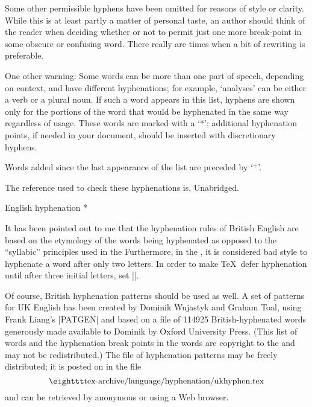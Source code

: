 Some other permissible hyphens have been omitted
for reasons of style or clarity.  While this is at
least partly a matter of personal taste, an author should think of the
reader when deciding whether or not to permit just one more break-point
in some obscure or confusing word.  There really are times when a bit of
rewriting is preferable.

One other warning: Some words can be more than one part of speech,
depending on context, and have different hyphenations; for example,
`analyses' can be either a verb or a plural noun.  If such a word appears
in this list, hyphens are shown only for the portions of the word that
would be hyphenated in the same way regardless of usage.  These words
are marked with a `*'; additional hyphenation points, if needed in your
document, should be inserted with discretionary hyphens.

Words added since the last appearance of the list are preceded by `${}^+$'.

The reference used to check these hyphenations is, Unabridged.

\head * English hyphenation *

It has been pointed out to me that the hyphenation rules of British English
are based on the etymology of the words being hyphenated as opposed to
the ``syllabic'' principles used in the   Furthermore, in the
, it is considered bad style to hyphenate a word after only two letters.
In order to make \TeX\ defer hyphenation until after three initial letters,
set ||.

Of course, British hyphenation patterns should be used as well.
A set of patterns for UK English has been created by Dominik Wujastyk and
Graham Toal, using Frank Liang's |PATGEN| and based on a file of 114925
British-hyphenated words generously made available to Dominik by Oxford
University Press.  (This list of words and the hyphenation break points
in the words are copyright to the  and may not be redistributed.)
The file of hyphenation patterns may be freely distributed; it is
posted on {\CTAN} in the file
$$\hbox{\tt tex-archive/language/hyphenation/ukhyphen.tex}$$
and can be retrieved by anonymous  or using a Web browser.


